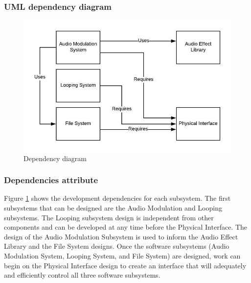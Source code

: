     \subsubsection{UML dependency diagram}
        \begin{figure}[!ht]
            \centering
            \includegraphics{diagrams/dependency-diagram.jpeg}
            \caption{Dependency diagram}
            \label{fig:dependency}
        \end{figure}
        
    \subsubsection{Dependencies attribute}
       Figure \ref{fig:dependency} shows the development dependencies for each subsystem. The first subsystems that can be designed are the Audio Modulation and Looping subsystems. The Looping subsystem design is independent from other components and can be developed at any time before the Physical Interface. The design of the Audio Modulation Subsystem is used to inform the Audio Effect Library and the File System designs. Once the software subsystems (Audio Modulation System, Looping System, and File System) are designed, work can begin on the Physical Interface design to create an interface that will adequately and efficiently control all three software subsystems.
        

\clearpage
